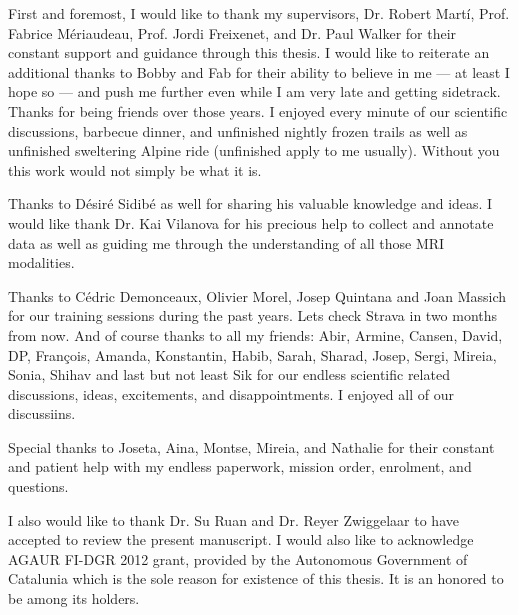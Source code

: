

\begin{acknowledgements}      %
First and foremost, I would like to thank my supervisors, Dr. Robert Mart\'i, Prof. Fabrice M\'eriaudeau, Prof. Jordi Freixenet, and Dr. Paul Walker for their constant support and guidance through this thesis.
I would like to reiterate an additional thanks to Bobby and Fab for their ability to believe in me --- at least I hope so --- and push me further even while I am very late and getting sidetrack.
Thanks for being friends over those years.
I enjoyed every minute of our scientific discussions, barbecue dinner, and unfinished nightly frozen trails as well as unfinished sweltering Alpine ride (unfinished apply to me usually).
Without you this work would not simply be what it is. 

Thanks to D\'esir\'e Sidib\'e as well for sharing his valuable knowledge and ideas.
I would like thank Dr. Kai Vilanova for his precious help to collect and annotate data as well as guiding me through the understanding of all those MRI modalities.

Thanks to C\'edric Demonceaux, Olivier Morel, Josep Quintana and Joan Massich for our training sessions during the past years.
Lets check Strava in two months from now.
And of course thanks to all my friends: Abir, Armine, Cansen, David, DP, Fran\c{c}ois, Amanda, Konstantin, Habib, Sarah, Sharad, Josep, Sergi, Mireia, Sonia, Shihav and last but not least Sik for our endless scientific related discussions, ideas, excitements, and disappointments.
I enjoyed all of our discussiins.

Special thanks to Joseta, Aina, Montse, Mireia, and Nathalie for their constant and patient help with my endless paperwork, mission order, enrolment, and questions.

I also would like to thank Dr. Su Ruan and Dr. Reyer Zwiggelaar to have accepted to review the present manuscript.
I would also like to acknowledge AGAUR FI-DGR 2012 grant, provided by the Autonomous Government of Catalunia which is the sole reason for existence of this thesis.
It is an honored to be among its holders.


\end{acknowledgements}
